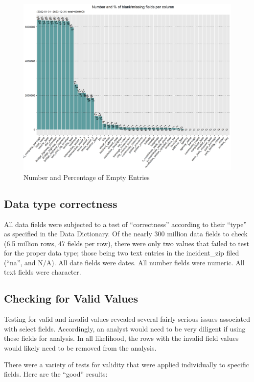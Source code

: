 \documentclass[12pt, titlepage]{article}
\begin{document}
\begin{figure}[htbp]
  \centering
	  \includegraphics[scale=0.7]{BlankFields.png}
	  \caption{Number and Percentage of Empty Entries}
	  \label{fig:blank_fields}
\end{figure}


\subsection{Data type correctness}
All data fields were subjected to a test of ``correctness'' according to their ``type'' as specified
in the Data Dictionary.  Of the nearly 300 million data fields to check (6.5 million rows, 47 fields per row), there were only two  values that failed to test for the
proper data type; those being two text entries in the incident\_zip filed (``na'', and N/A). All date fields were dates. All number fields were numeric. All text
fields were character.

\subsection{Checking for Valid Values}
Testing for valid and invalid values revealed several fairly serious issues associated with select fields. Accordingly, an analyst would need to be
very diligent if using these fields for analysis. In all likelihood, the rows with the invalid field values would likely need to be removed from the
analysis.

There were a variety of tests for validity that were applied individually to specific fields. Here are the ``good'' results:
\end{document}
